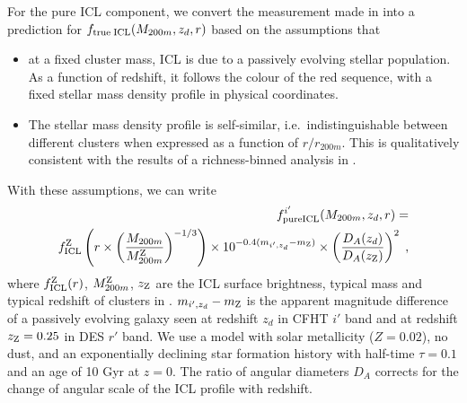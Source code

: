 {For the pure ICL component, we convert the measurement made in \citet{icl} into a prediction for $f_{\rm true\; ICL}(M_{200m}, z_{d}, r)$ based on the assumptions that
\begin{itemize}
\item at a fixed cluster mass, ICL is due to a passively evolving stellar population. As a function of redshift, it follows the colour of the red sequence, with a fixed stellar mass density profile in physical coordinates. %
\item The stellar mass density profile is self-similar, i.e.~indistinguishable between different clusters when expressed as a function of $r/r_{200m}$. This is qualitatively consistent with the results of a richness-binned analysis in \citet{icl}.
\end{itemize}

With these assumptions, we can write
\begin{eqnarray}
f_{\rm pure ICL}^{i'}(M_{200m}, z_{d}, r) = \nonumber \\ 
f_{\rm ICL}^{\rm Z}\left(r\times \left(\frac{M_{200m}}{M_{200m}^{\rm Z}}\right)^{-1/3}\right) \times 10^{-0.4(m_{i',z_d}-m_{\rm Z})} \times \left(\frac{D_{A}(z_d)}{D_{A}(z_{\rm Z})}\right)^2 \; ,
\label{eqn:ftransform}
\end{eqnarray}
where $f_{\rm ICL}^{\rm Z}(r)$, $M_{200m}^{\rm Z}$, $z_{\rm Z}$ are the ICL surface brightness, typical mass and typical redshift of clusters in \citet{icl}. $m_{i',z_d}-m_{\rm Z}$ is the apparent magnitude difference of a passively evolving galaxy seen at redshift $z_d$ in CFHT $i'$ band and at redshift $z_{\rm Z}=0.25$ in DES $r'$ band. We use a \citet{2003MNRAS.344.1000B} model with solar metallicity ($Z=0.02$), no dust, and an exponentially declining star formation history with half-time $\tau=0.1$ and an age of 10 Gyr at $z=0$. The ratio of angular diameters $D_A$ corrects for the change of angular scale of the ICL profile with redshift.



}
